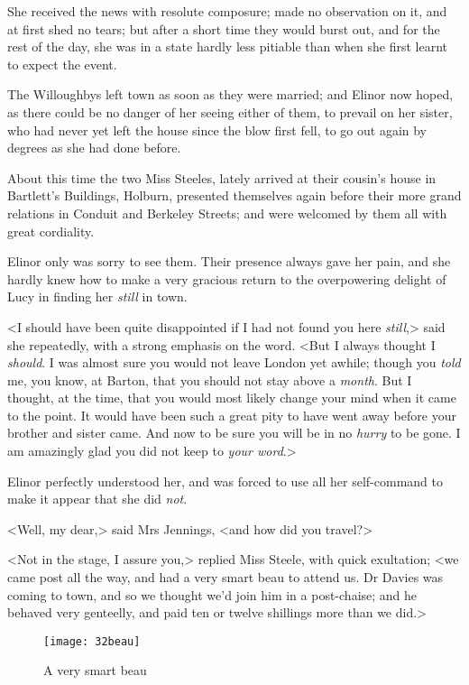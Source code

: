 She received the news with resolute composure; made no observation on it, and at first shed no tears; but after a short time they would burst out, and for the rest of the day, she was in a state hardly less pitiable than when she first learnt to expect the event.

The Willoughbys left town as soon as they were married; and Elinor now hoped, as there could be no danger of her seeing either of them, to prevail on her sister, who had never yet left the house since the blow first fell, to go out again by degrees as she had done before.

About this time the two Miss Steeles, lately arrived at their cousin's house in Bartlett's Buildings, Holburn, presented themselves again before their more grand relations in Conduit and Berkeley Streets; and were welcomed by them all with great cordiality.

Elinor only was sorry to see them. Their presence always gave her pain, and she hardly knew how to make a very gracious return to the overpowering delight of Lucy in finding her \textit{still} in town.

<I should have been quite disappointed if I had not found you here \textit{still},> said she repeatedly, with a strong emphasis on the word. <But I always thought I \textit{should}. I was almost sure you would not leave London yet awhile; though you \textit{told} me, you know, at Barton, that you should not stay above a \textit{month}. But I thought, at the time, that you would most likely change your mind when it came to the point. It would have been such a great pity to have went away before your brother and sister came. And now to be sure you will be in no \textit{hurry} to be gone. I am amazingly glad you did not keep to \textit{your word}.>

Elinor perfectly understood her, and was forced to use all her self-command to make it appear that she did \textit{not}.

<Well, my dear,> said Mrs Jennings, <and how did you travel?>

<Not in the stage, I assure you,> replied Miss Steele, with quick exultation; <we came post all the way, and had a very smart beau to attend us. Dr Davies was coming to town, and so we thought we'd join him in a post-chaise; and he behaved very genteelly, and paid ten or twelve shillings more than we did.>

\begin{figure}[tbph]
\centering
\texttt{[image: 32beau]}
\caption{A very smart beau}
\end{figure}

